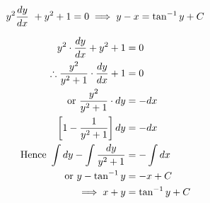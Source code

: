 \documentclass[14pt,fleqn]{extarticle}
\begin{document}
 
\begin{snippet}
    
    \incorrect
    
    \[ y^2\frac{dy}{dx}\ + y^2 + 1 = 0 \implies y -x = \tan^{-1} y + C\]
    \reason
    
    \begin{align}
	y^2 \cdot \frac{dy}{dx} + y^2 + 1 &= 0 \\
	\therefore \frac{y^2}{y^2+1}\cdot\frac{dy}{dx} + 1 &= 0 \\
	\text{or }\dfrac{y^2}{y^2+1}\cdot dy &= -dx  \\
	\left[1 - \frac{1}{y^2+1} \right] dy &= -dx \\
	\text{Hence }\int dy - \int \frac{dy}{y^2+1} &= -\int dx \\
	\text{or } y - \tan^{-1} y &= -x + C \\
	\implies x + y &= \tan^{-1} y + C 
\end{align}
    
\end{snippet} 
\end{document}
